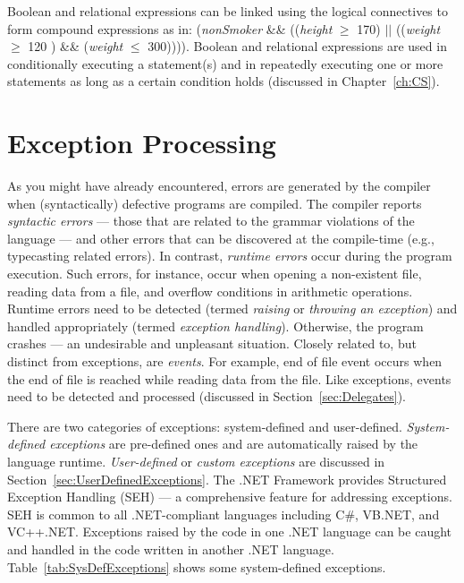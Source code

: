 Boolean and relational expressions can be linked using the logical
connectives to form compound expressions as in: (\emph{nonSmoker}
\&\& ((\emph{height} $\geq$ 170) $\vert \vert$ ((\emph{weight}
$\geq$ 120 ) \&\& (\emph{weight} $\leq$ 300)))). Boolean and
relational expressions are used in conditionally executing a
statement(s) and in repeatedly executing one or more statements as
long as a certain condition holds (discussed in
Chapter~\ref{ch:CS}).


{\samepage\vspace{1ex}\noindent\usebox{\phicsep}\vspace{1.5ex}}
\vspace{-0.4in}
\section{Exception Processing}    \label{sec:ExcepHandling}


As you might have already encountered, errors are generated by the
compiler when (syntactically) defective programs are compiled. The
compiler reports \emph{syntactic errors} --- those that are
related to the grammar violations of the language --- and other
errors that can be discovered at the compile-time (e.g.,
typecasting related errors). In contrast, \emph{runtime errors}
occur during the program execution. Such errors, for instance,
occur when opening a non-existent file, reading data from a file,
and overflow conditions in arithmetic operations. Runtime errors
need to be detected (termed \emph{raising} or \emph{throwing an
exception}) and handled appropriately (termed \emph{exception
handling}). Otherwise, the program crashes --- an undesirable and
unpleasant situation. Closely related to, but distinct from
exceptions, are \emph{events}. For example, end of file event
occurs when the end of file is reached while reading data from the
file. Like exceptions, events need to be detected and processed
(discussed in Section~\ref{sec:Delegates}).


There are two categories of exceptions: system-defined and
user-defined. \emph{System-defined exceptions} are pre-defined
ones and are automatically raised by the language runtime.
\emph{User-defined} or \emph{custom exceptions} are discussed in
Section~\ref{sec:UserDefinedExceptions}. The .NET Framework
provides Structured Exception Handling (SEH) --- a comprehensive
feature for addressing exceptions. SEH is common to all
.NET-compliant languages including C\#, VB.NET, and VC++.NET.
Exceptions raised by the code in one .NET language can be caught
and handled in the code written in another .NET language.
Table~\ref{tab:SysDefExceptions} shows some system-defined
exceptions.



